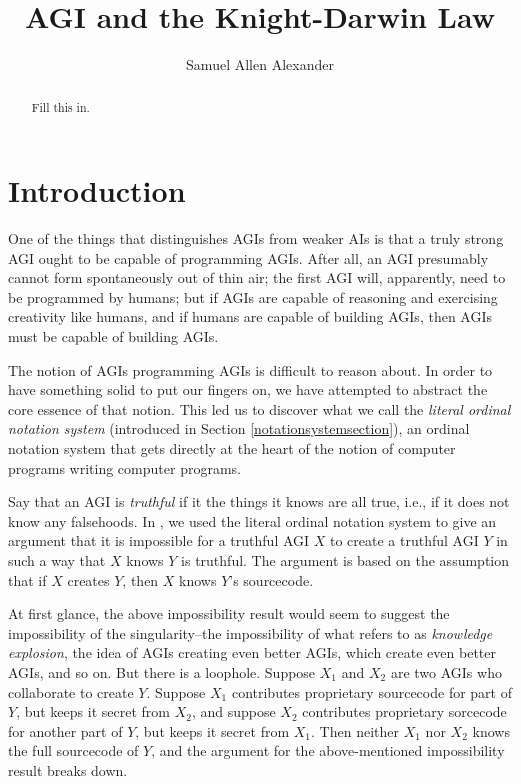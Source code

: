 \documentclass[runningheads]{llncs}
\begin{document}
\title{AGI and the Knight-Darwin Law}

\author{Samuel Allen Alexander}

\maketitle

\begin{abstract}
Fill this in.

\end{abstract}

\section{Introduction}

One of the things that distinguishes AGIs from weaker AIs is that a truly
strong AGI ought to be capable of programming AGIs. After all, an AGI
presumably cannot form spontaneously out of thin air; the first AGI will,
apparently, need to be programmed by humans; but if AGIs are capable of
reasoning and exercising creativity like humans, and if humans are capable
of building AGIs, then AGIs must be capable of building AGIs.

The notion of AGIs programming AGIs is difficult to reason about. In order
to have something solid to put our fingers on, we have attempted to abstract
the core essence of that notion. This led us to discover
what we call the \emph{literal ordinal notation system} (introduced in Section
\ref{notationsystemsection}), an ordinal notation system that gets directly at
the heart of the notion of computer programs writing computer programs.

Say that an AGI is \emph{truthful} if it the things it knows are all true,
i.e., if it does not know any falsehoods.
In \cite{alexander2019}, we used the literal ordinal notation system to give an
argument
that it is impossible for a truthful AGI $X$ to create a truthful AGI $Y$
in such a way that $X$ knows $Y$ is truthful.
The argument is based on the assumption that if $X$ creates $Y$, then $X$
knows $Y$'s sourcecode.

At first glance, the above impossibility result would
seem to suggest the impossibility of the singularity--the impossibility of
what \cite{hutter2012} refers to as \emph{knowledge explosion}, the idea of
AGIs creating even better AGIs, which create even better AGIs, and so on.
But there is a loophole. Suppose $X_1$ and $X_2$ are two AGIs
who collaborate to create $Y$. Suppose $X_1$ contributes proprietary sourcecode for
part of $Y$, but keeps it secret from $X_2$, and suppose $X_2$ contributes proprietary
sorcecode for another part of $Y$, but keeps it secret from $X_1$. Then neither
$X_1$ nor $X_2$ knows the full sourcecode of $Y$, and the argument for the
above-mentioned impossibility result breaks down.





\end{document}
